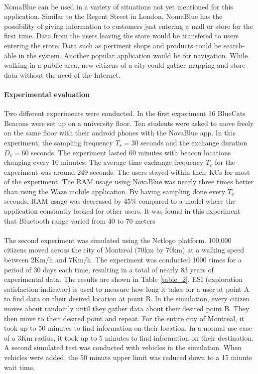\documentclass[a4paper,12pt]{article}
\begin{document}
\paragraph{}
NomaBlue can be used in a variety of situations not yet mentioned for this application. Similar to the Regent Street in London, NomaBlue has the possibility of giving information to customers just entering a mall or store for the first time. Data from the users leaving the store would be transfered to users entering the store. Data such as pertinent shops and products could be search-able in the system. Another popular application would be for navigation. While walking in a public area, new citizens of a city could gather mapping and store data without the need of the Internet.
\paragraph{Experimental evaluation}
Two different experiments were conducted. In the first experiment 16 BlueCats Beacons were set up on a university floor. Ten students were asked to move freely on the same floor with their android phones with the NovaBlue app. In this experiment, the sampling frequency $T_s = 30$ seconds and the exchange duration $D_e = 60$ seconds. The experiment lasted 60 minutes with beacon locations changing every 10 minutes. The average time exchange frequency $T_e$ for the experiment was around 249 seconds. The users stayed within their KCs for most of the experiment. The RAM usage using NovaBlue was nearly three times better than using the Waze \cite{waze} mobile application. By having sampling done every $T_e$ seconds, RAM usage was decreased by 45\% compared to a model where the application constantly looked for other users. It was found in this experiment that Bluetooth range varied from 40 to 70 meters
\paragraph{}
The second experiment was simulated using the Netlogo platform. 100,000 citizens moved across the city of Montreal (70km by 70km) at a walking speed between 2Km/h and 7Km/h. The experiment was conducted 1000 times for a period of 30 days each time, resulting in a total of nearly 83 years of experimental data. The results are shown in Table \ref{table_2}. ESI (exploration satisfaction indicator) is used to measure how long it takes for a user at point A to find data on their desired location at point B. In the simulation, every citizen moves about randomly until they gather data about their desired point B. They then move to their desired point and repeat. For the entire city of Montreal, it took up to 50 minutes to find information on their location. In a normal use case of a 3Km radius, it took up to 5 minutes to find information on their destination. A second simulated test was conducted with vehicles in the simulation. When vehicles were added, the 50 minute upper limit was reduced down to a 15 minute wait time.
\end{document}
